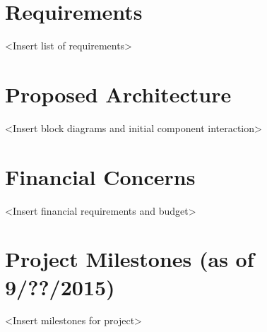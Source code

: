 \documentclass[letterpaper]{article}
\begin{document}
  \section{Requirements}
  \textless Insert list of requirements\textgreater
  
  \section{Proposed Architecture}
  \textless Insert block diagrams and initial component interaction\textgreater
  
  \section{Financial Concerns}
  \textless Insert financial requirements and budget\textgreater
  
  \section{Project Milestones (as of 9/??/2015)}
  \textless Insert milestones for project\textgreater
\end{document}
